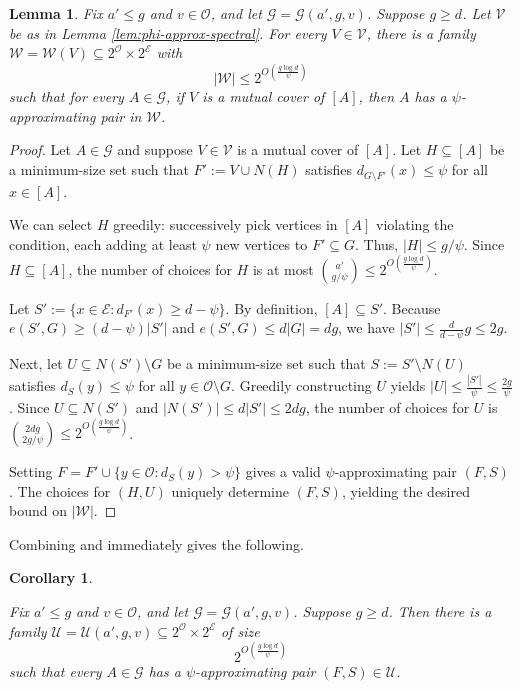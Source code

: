 \documentclass{amsart}
\newtheorem{cor}[thm]{Corollary}
\newtheorem{lem}[thm]{Lemma}
\theoremstyle{definition}
\newcommand{\0}[0]{\emptyset}
\begin{document}
\begin{lem}\label{lem:psi-approx-spectral}
Fix $a' \le g$ and $v \in \mathcal{O}$, and let $\mathcal{G} = \mathcal{G}(a', g, v)$. Suppose $g \ge d$. Let $\mathcal{V}$ be as in Lemma \ref{lem:phi-approx-spectral}. For every $V \in \mathcal{V}$, there is a family $\mathcal{W} = \mathcal{W}(V) \subseteq 2^{\mathcal{O}} \times 2^{\mathcal{E}}$ with
$$|\mathcal{W}| \le 2^{O\left( \frac{g \log d}{\psi} \right) }$$
such that for every $A \in \mathcal{G}$, if $V$ is a mutual cover of $[A]$, then $A$ has a $\psi$-approximating pair in $\mathcal{W}$.
\end{lem}
\begin{proof}Let $A \in \mathcal{G}$ and suppose $V \in \mathcal{V}$ is a mutual cover of $[A]$. Let $H \subseteq [A]$ be a minimum-size set such that $F' := V \cup N(H)$ satisfies $d_{G \setminus F'}(x) \le \psi$ for all $x \in [A]$. 

We can select $H$ greedily: successively pick vertices in $[A]$ violating the condition, each adding at least $\psi$ new vertices to $F' \subseteq G$. Thus, $|H| \le g/\psi$. 
Since $H \subseteq [A]$, the number of choices for $H$ is at most $\binom{a'}{g/\psi} \le 2^{O\left( \frac{g \log d}{\psi} \right)}$.

Let $S' := \{x \in \mathcal{E} : d_{F'}(x) \ge d - \psi\}$. By definition, $[A] \subseteq S'$. Because $e(S', G) \ge (d-\psi)|S'|$ and $e(S', G) \le d|G| = dg$, we have $|S'| \le \frac{d}{d-\psi}g \le 2g$.

Next, let $U \subseteq N(S') \setminus G$ be a minimum-size set such that $S := S' \setminus N(U)$ satisfies $d_S(y) \le \psi$ for all $y \in \mathcal{O} \setminus G$. Greedily constructing $U$ yields $|U| \le \frac{|S'|}{\psi}  \le \frac{2g}{\psi}$. Since $U \subseteq N(S')$ and $|N(S')| \le d|S'| \le 2dg$, the number of choices for $U$ is $\binom{2dg}{2g/\psi} \le 2^{ O\left( \frac{g \log d}{\psi} \right)}$.

Setting $F = F' \cup \{y \in \mathcal{O} : d_S(y) > \psi\}$ gives a valid $\psi$-approximating pair $(F,S)$. The choices for $(H, U)$ uniquely determine $(F,S)$, yielding the desired bound on $|\mathcal{W}|$.\end{proof}

Combining  and  immediately gives the following. 


\begin{cor}\label{cor:psi-approx-spectral}

Fix $a' \le g$ and $v \in \mathcal{O}$, and let $\mathcal{G} = \mathcal{G}(a', g, v)$. Suppose $g \ge d$. Then there is a family $\mathcal{U} = \mathcal{U}(a', g, v) \subseteq 2^{\mathcal{O}} \times 2^{\mathcal{E}}$ of size$$  2^{ O\left( \frac{g \log d}{\psi} \right)}$$such that every $A \in \mathcal{G}$ has a $\psi$-approximating pair $(F, S) \in \mathcal{U}$.
\end{cor}
\end{document}
